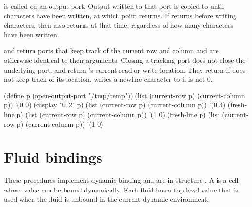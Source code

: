 \begin{protos}
\end{protos}
\noindent
{} is called on an output port.
Output written to that port is copied to  until 
 characters have been written, at which point  returns.
If  returns before writing  characters, then
  also returns at that time, regardless of how many
 characters have been written.

\begin{protos}
\end{protos}
\noindent {} and 
 return ports that keep track of the current row and column and
 are otherwise identical to their arguments.
Closing a tracking port does not close the underlying port.
 and  return
  's current read or write location.
They return  if  does not keep track of its location.
 writes a newline character to  if
  is not 0.

\begin{example}
(define p (open-output-port "/tmp/temp"))
(list (current-row p) (current-column p))
    \evalsto '(0 0)
(display "012" p)
(list (current-row p) (current-column p))
    \evalsto '(0 3)
(fresh-line p)
(list (current-row p) (current-column p))
    \evalsto '(1 0)
(fresh-line p)
(list (current-row p) (current-column p))
    \evalsto '(1 0)
\end{example}

\section{Fluid bindings}

These procedures implement dynamic binding and are in structure .
A  is a cell whose value can be bound dynamically.
Each fluid has a top-level value that is used when the fluid
 is unbound in the current dynamic environment.

